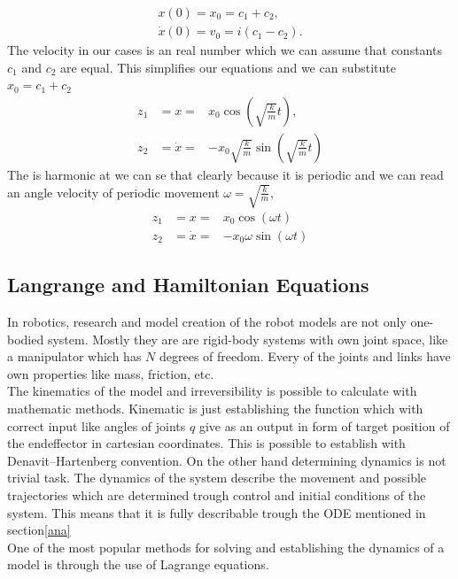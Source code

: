 \begin{eqnarray}
x(0)=x_0 = c_1 + c_2,\\
\dot{x}(0)=v_0 = i(c_1-c_2).
\end{eqnarray}
The velocity in our cases is an real number which we can assume that constants $c_1$ and $c_2$ are equal. 
This simplifies our equations  and we can substitute $x_0 = c_1 +c_2$
\begin{eqnarray}
	z_1 &= x =& x_0\cos\left(\sqrt{\frac{k}{m}}t\right),\\
	z_2 &= \dot{x} =& -x_0\sqrt{\frac{k}{m}}\sin\left(\sqrt{\frac{k}{m}}t\right)
\end{eqnarray}
The is harmonic at we can se that clearly because it is periodic and we can read an angle velocity of periodic movement $\omega = \sqrt{\frac{k}{m}}$,
\begin{eqnarray}
	z_1 &= x =& x_0\cos\left(\omega t\right)\\
	z_2 &= \dot{x} =& -x_0\omega\sin\left(\omega t\right)
\end{eqnarray}
\subsection{Langrange and Hamiltonian Equations}
In robotics, research and model creation of the robot models are not only one-bodied system. Mostly they are are rigid-body systems with own joint space, like a manipulator which has $N$ degrees of freedom. Every of the joints and links have own properties like mass, friction, etc.\\
The kinematics of the model and irreversibility is possible to calculate with mathematic methods. Kinematic is just establishing the function which with correct input like angles of joints $q$ give as an output in form of target position of the endeffector in cartesian coordinates. This is possible to establish with Denavit–Hartenberg convention\cite{dh}.  On the other hand determining dynamics is not trivial task. The dynamics of the system describe the movement and possible trajectories which are determined trough control and initial conditions of the system. This means that it is fully describable trough the ODE mentioned in section\ref{ana}\\
One of the most popular methods for solving and establishing the dynamics of a model is through the use of Lagrange equations.
